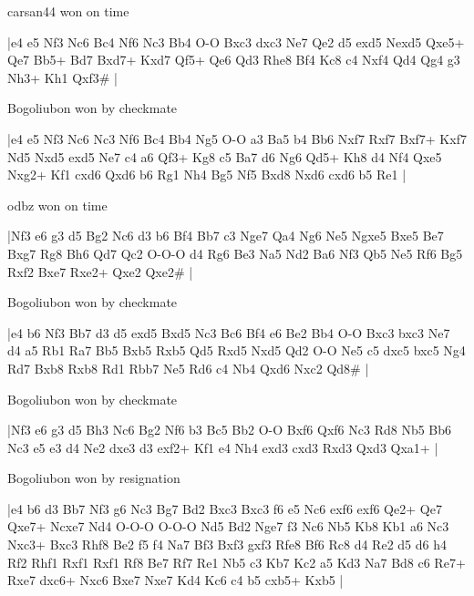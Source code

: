\showboard

carsan44 won on time

\makegametitle
|e4 e5 Nf3 Nc6 Bc4 Nf6 Nc3 Bb4 O-O Bxc3 dxc3 Ne7 Qe2 d5 exd5 Nexd5 Qxe5+ Qe7 Bb5+ Bd7 Bxd7+ Kxd7 Qf5+ Qe6 Qd3 Rhe8 Bf4 Kc8 c4 Nxf4 Qd4 Qg4 g3 Nh3+ Kh1 Qxf3\#  |

\showboard

Bogoliubon won by checkmate

\makegametitle
|e4 e5 Nf3 Nc6 Nc3 Nf6 Bc4 Bb4 Ng5 O-O a3 Ba5 b4 Bb6 Nxf7 Rxf7 Bxf7+ Kxf7 Nd5 Nxd5 exd5 Ne7 c4 a6 Qf3+ Kg8 c5 Ba7 d6 Ng6 Qd5+ Kh8 d4 Nf4 Qxe5 Nxg2+ Kf1 cxd6 Qxd6 b6 Rg1 Nh4 Bg5 Nf5 Bxd8 Nxd6 cxd6 b5 Re1  |

\showboard

odbz won on time

\makegametitle
|Nf3 e6 g3 d5 Bg2 Nc6 d3 b6 Bf4 Bb7 c3 Nge7 Qa4 Ng6 Ne5 Ngxe5 Bxe5 Be7 Bxg7 Rg8 Bh6 Qd7 Qc2 O-O-O d4 Rg6 Be3 Na5 Nd2 Ba6 Nf3 Qb5 Ne5 Rf6 Bg5 Rxf2 Bxe7 Rxe2+ Qxe2 Qxe2\#  |

\showboard

Bogoliubon won by checkmate

\makegametitle
|e4 b6 Nf3 Bb7 d3 d5 exd5 Bxd5 Nc3 Bc6 Bf4 e6 Be2 Bb4 O-O Bxc3 bxc3 Ne7 d4 a5 Rb1 Ra7 Bb5 Bxb5 Rxb5 Qd5 Rxd5 Nxd5 Qd2 O-O Ne5 c5 dxc5 bxc5 Ng4 Rd7 Bxb8 Rxb8 Rd1 Rbb7 Ne5 Rd6 c4 Nb4 Qxd6 Nxc2 Qd8\#  |

\showboard

Bogoliubon won by checkmate

\makegametitle
|Nf3 e6 g3 d5 Bh3 Nc6 Bg2 Nf6 b3 Bc5 Bb2 O-O Bxf6 Qxf6 Nc3 Rd8 Nb5 Bb6 Nc3 e5 e3 d4 Ne2 dxe3 d3 exf2+ Kf1 e4 Nh4 exd3 cxd3 Rxd3 Qxd3 Qxa1+  |

\showboard

Bogoliubon won by resignation

\makegametitle
|e4 b6 d3 Bb7 Nf3 g6 Nc3 Bg7 Bd2 Bxc3 Bxc3 f6 e5 Nc6 exf6 exf6 Qe2+ Qe7 Qxe7+ Ncxe7 Nd4 O-O-O O-O-O Nd5 Bd2 Nge7 f3 Nc6 Nb5 Kb8 Kb1 a6 Nc3 Nxc3+ Bxc3 Rhf8 Be2 f5 f4 Na7 Bf3 Bxf3 gxf3 Rfe8 Bf6 Rc8 d4 Re2 d5 d6 h4 Rf2 Rhf1 Rxf1 Rxf1 Rf8 Be7 Rf7 Re1 Nb5 c3 Kb7 Kc2 a5 Kd3 Na7 Bd8 c6 Re7+ Rxe7 dxc6+ Nxc6 Bxe7 Nxe7 Kd4 Kc6 c4 b5 cxb5+ Kxb5  |

